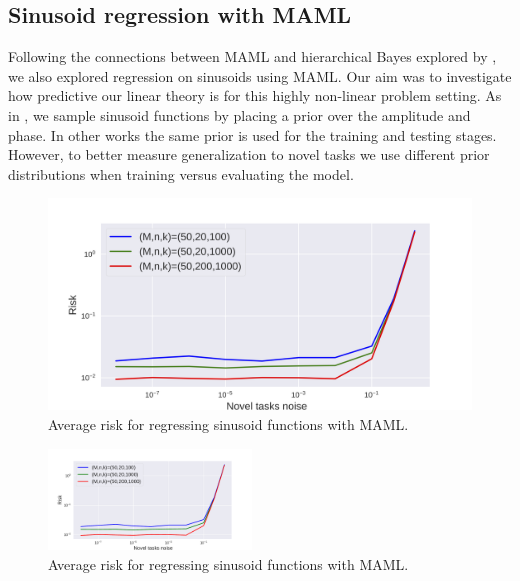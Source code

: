 \subsection{Sinusoid regression with MAML}

Following the connections between MAML and hierarchical Bayes explored by \citet{grant2018recasting}, we also explored regression on sinusoids using MAML. Our aim was to investigate how predictive our linear theory is for this highly non-linear problem setting. As in \citet{finn2017model}, we sample sinusoid functions by placing a prior over the amplitude and phase. In other works \citep{finn2017model, grant2018recasting} the same prior is used for the training and testing stages. However, to better measure generalization to novel tasks we use different prior distributions when training versus evaluating the model.

\iflatexml
\begin{figure}
    \includegraphics[width=4\linewidth]{main/images/maml_sinusoid.png}
  \caption{Average risk for regressing sinusoid functions with MAML.}
  \label{fig:maml_sinusoid}
\end{figure}
\else
\begin{figure}
  \begin{center}
    \includegraphics[width=0.48\textwidth]{main/images/maml_sinusoid.pdf}
  \end{center}
  \caption{Average risk for regressing sinusoid functions with MAML.}
  \label{fig:maml_sinusoid}
\end{figure}
\fi

